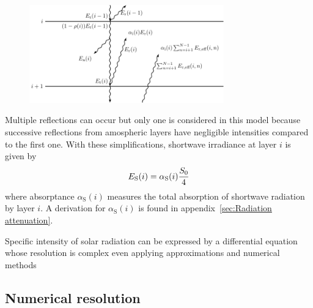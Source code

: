 \documentclass[a4paper,10pt,twocolumn,\classoptions]{article}
\begin{document}
\begin{figure}[h]
  \centering
  \includegraphics*[keepaspectratio=true,width=0.75\textwidth]{shortwave_radiation}
  \caption{} %
  \label{fig:shortwave_radiation}
\end{figure}
Multiple reflections can occur but only one is considered in this model because successive reflections from amospheric layers have negligible intensities compared to the first one.
With these simplifications, shortwave irradiance at layer $i$ is given by
\begin{equation}
  \label{eq:irradiance_shortwave}
  E_\text{S}(i) = \alpha_\text{S}(i) \frac{S_0}{4}
\end{equation}
where absorptance $\alpha_\text{S}(i)$ measures the total absorption of shortwave radiation by layer $i$. A derivation for $\alpha_\text{S}(i)$ is found in appendix~\ref{sec:Radiation attenuation}.


Specific intensity of solar radiation can be expressed by a differential equation whose resolution is complex even applying approximations and numerical methods



\subsection{Numerical resolution}
\label{sec:Numerical resolution}
\end{document}
